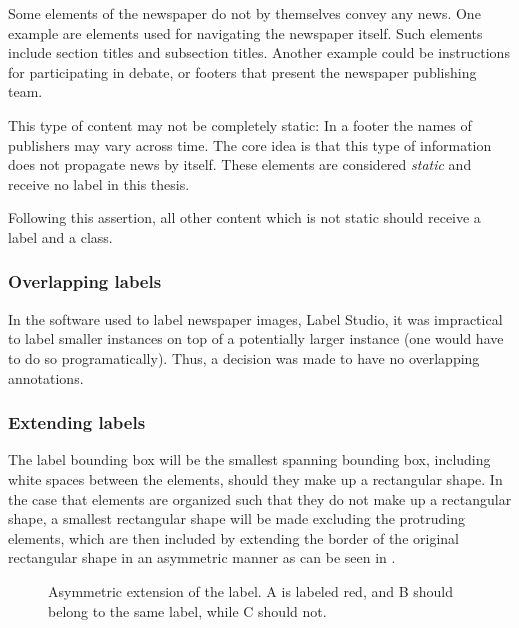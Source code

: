 \documentclass[oneside, english, bibtex]{kththesis}
\begin{document}
Some elements of the newspaper do not by themselves convey any news. One example are elements used for navigating the newspaper itself.
Such elements include section titles and subsection titles. Another example could be instructions for participating in debate, or footers that present the newspaper publishing team.

This type of content may not be completely static: In a footer the names of publishers may vary across time. The core idea is that this type of information does not propagate news by itself. These elements are considered \textit{static} and receive no label in this thesis.


Following this assertion, all other content which is not static should receive a label and a class.

\subsubsection{Overlapping labels}
\label{subsub:overlappinglabels}

In the software used to label newspaper images, Label Studio, it was impractical to label smaller instances on top of a potentially larger instance (one would have to do so programatically). Thus, a decision was made to have no overlapping annotations.

\subsubsection{Extending labels}

The label bounding box will be the smallest spanning bounding box, including white spaces between the elements, should they make up a rectangular shape.
In the case that elements are organized such that they do not make up a rectangular shape, a smallest rectangular shape will be made excluding the protruding elements,
which are then included by extending the border of the original rectangular shape in an asymmetric manner as can be seen in .

\begin{figure}[H]
\caption{Asymmetric extension of the label. A is labeled red, and B should belong to the same label, while C should not.}
\label{fig:asymextention}%
\end{figure}
\end{document}
